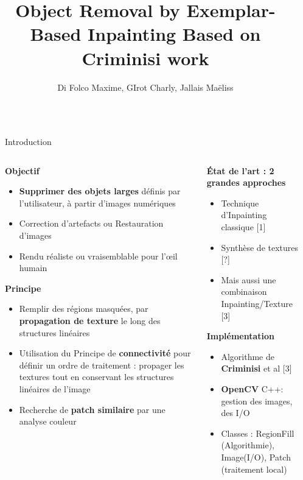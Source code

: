 \documentclass[final,hyperref={pdfpagelabels=false}]{beamer}
\title{\huge  Object Removal by Exemplar-Based Inpainting \small Based on Criminisi work}
\author{Di Folco Maxime, GIrot Charly, Jallais Maëliss}
\institute{Ecole Supérieure de Chimie Physique Électronique de Lyon}
\begin{document}
\begin{frame}[t]

\begin{columns}[t]
\begin{column}{.02\textwidth} \end{column}
\begin{column}{.930\textwidth} 
\begin{block}{\Large Introduction}

\begin{columns}[t]
\begin{column}{.4\textwidth}
\textbf{Objectif}
\begin{itemize} []
\item \textbf{Supprimer des objets larges} définis par l'utilisateur, à partir d'images numériques
\item Correction d'artefacts ou Restauration d'images
\item Rendu réaliste ou vraisemblable pour l'œil humain
\end{itemize}
\textbf{Principe}
\begin{itemize} 
\item Remplir des régions masquées, par \textbf{propagation de texture} le long des structures linéaires 
\item Utilisation du Principe de \textbf{connectivité} pour définir un ordre de traitement : propager les textures tout en conservant les structures linéaires de l'image
\item Recherche de \textbf{patch similaire} par une analyse couleur
\end{itemize}
\end{column}



\begin{column}{.3\textwidth}

\textbf{État de l'art : 2 grandes approches}
\begin{itemize}
\item Technique d'Inpainting classique [1]
\item Synthèse de textures [?]
\item Mais aussi une combinaison Inpainting/Texture [3]
\end{itemize}

\textbf{Implémentation}
\begin{itemize}
\item Algorithme de \textbf{Criminisi} et al [3]
\item \textbf{OpenCV} C++: gestion des images, des I/O
\item Classes : RegionFill (Algorithmie), Image(I/O), Patch (traitement local)
\end{itemize}


\end{column}
\end{columns}
\end{block}
\end{column}
\end{columns}
\end{frame}
\end{document}
